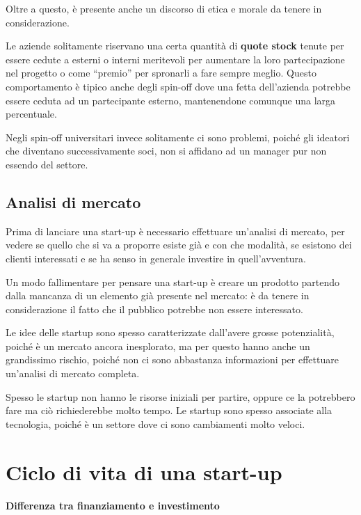 

Oltre a questo, è presente anche un discorso di etica e morale da tenere in
considerazione.

Le aziende solitamente riservano una certa quantità di \textbf{quote stock}
tenute per essere cedute a esterni o interni meritevoli per aumentare la loro
partecipazione nel progetto o come ``premio'' per spronarli a fare sempre
meglio. Questo comportamento è tipico anche degli spin-off dove una fetta
dell'azienda potrebbe essere ceduta ad un partecipante esterno, mantenendone
comunque una larga percentuale.

Negli spin-off universitari invece solitamente ci sono problemi, poiché gli
ideatori che diventano successivamente soci, non si affidano ad un manager pur
non essendo del settore.

\subsection{Analisi di mercato}

Prima di lanciare una start-up è necessario effettuare un'analisi di mercato,
per vedere se quello che si va a proporre esiste già e con che modalità, se
esistono dei clienti interessati e se ha senso in generale investire in
quell'avventura.

Un modo fallimentare per pensare una start-up è creare un prodotto partendo
dalla mancanza di un elemento già presente nel mercato: è da tenere in
considerazione il fatto che il pubblico potrebbe non essere interessato.

Le idee delle startup sono spesso caratterizzate dall'avere grosse
potenzialità, poiché è un mercato ancora inesplorato, ma per questo hanno anche
un grandissimo rischio, poiché non ci sono abbastanza informazioni per
effettuare un'analisi di mercato completa.

Spesso le startup non hanno le risorse iniziali per
partire, oppure ce la potrebbero fare ma ciò richiederebbe molto tempo. Le
startup sono spesso associate alla tecnologia, poiché è un settore dove ci sono
cambiamenti molto veloci.

\section{Ciclo di vita di una start-up}

\paragraph*{Differenza tra finanziamento e investimento}

